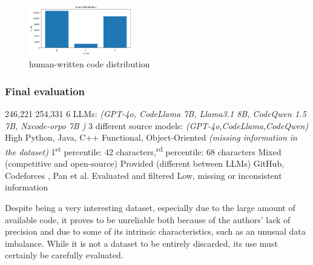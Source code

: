 \begin{figure}[H]
    \centering
    \includegraphics[width=0.4\textwidth]{img/CoDet-M4/lc_less.png}
    \caption{human-written code distribution}
    \label{fig:human-written_code_distribution}
\end{figure}





\clearpage %

\subsubsection*{Final evaluation}

\expandafter\def\csname CoDetM4HumanCode\endcsname{246,221}
\expandafter\def\csname CoDetM4LLMCode\endcsname{254,331}
\expandafter\def\csname CoDetM4NumLLMs\endcsname{6 LLMs: \textit{(GPT-4o, CodeLlama 7B, Llama3.1 8B, CodeQwen 1.5 7B, Nxcode-orpo 7B )}}
\expandafter\def\csname CoDetM4LLMDiversity\endcsname{3 different source models: \textit{(GPT-4o,CodeLlama,CodeQwen) }}
\expandafter\def\csname CoDetM4CurrentUse\endcsname{High}
\expandafter\def\csname CoDetM4Languages\endcsname{Python, Java, C++}
\expandafter\def\csname CoDetM4CodeTypes\endcsname{Functional, Object-Oriented \textit{(missing information in the dataset)}}
\expandafter\def\csname CoDetM4CodeSize\endcsname{1\textsuperscript{st} percentile: 42 characters,\textsuperscript{rd} percentile: 68 characters}
\expandafter\def\csname CoDetM4CodeContext\endcsname{Mixed (competitive and open-source)}
\expandafter\def\csname CoDetM4Prompts\endcsname{Provided (different between LLMs)}
\expandafter\def\csname CoDetM4Sources\endcsname{GitHub, Codeforces \cite{CodeforcesKaggle}, Pan et al. \cite{pan2024assessing}}
\expandafter\def\csname CoDetM4CodeQuality\endcsname{Evaluated and filtered}
\expandafter\def\csname CoDetM4Reliability\endcsname{Low, missing or inconsistent information}




Despite being a very interesting dataset, 
especially due to the large amount of available code, 
it proves to be unreliable both because of the authors' 
lack of precision and due to some of its intrinsic 
characteristics, such as an unusual data imbalance. 
While it is not a dataset to be entirely discarded, 
its use must certainly be carefully evaluated.
